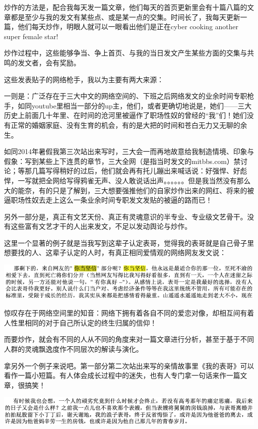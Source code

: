 \documentclass[9pt, b5paper]{article}
\begin{document}
炒作的方法是，配合我每天发一篇文章，他们每天的首页更新里会有十篇八篇的文章都是至少与我的发文有某些点、或是某一点的交集。时间长了，我每天更新一篇，他们每天炒作，明眼人就可以一眼看出他们是正在cyber cooking another super female star!

炒作过程中，这些能够争当、争上首页、与我的当日发文产生某些方面的交集与共鸣的发文者，会有奖励。 

这些发表贴子的网络枪手，我以为主要有两大来源：

一则是：广泛存在于三大中文的网络空间的、下班之后网络发文的业余时间专职枪手，如同youtube里相当一部分的up主，他们，或者更确切地说是，她们——三大历史上前面几十年里、在时间的沧河里被逼作了职场性奴的曾经的“我”们！她们没有正常的婚姻家庭、没有生育的机会，有的是大把的时间和苍白无力又无聊的余生。

如同2014年暑假我第三次站出来写时，三大会一而再地故意给我制造情境、印象与假象：写到某些上下连贯的章节，三大全网（是指当时发文的mitbbs.com）禁讨论；等那几篇写得稍好的过后，他们就会再有托儿蹦出来喊话说：好强悍、好彪悍，一写就把全网给写得鸦雀无声、没人敢说话出声。。。。。。但是我当然没有那么大的能奈，有的只是了解到，三大想要强推他们的自家炒作出来的网红、将来的被逼职场性奴去走上这么一条业余时间专职发文发贴的被逼的路而已！

另外一部分是，真正有文艺天份、真正有灵魂意识的半专业、专业级文艺骨干。没有这些富有文艺才干的人出来发文，不足以发动舆论与炒作。 

这里一个显著的例子就是当我写到这辈子认定表哥，觉得我的表哥就是自己骨子里想要找的人、这辈子认定的人时，有真正相同爱情观的网络网友发文说：

\begin{center}
\includegraphics[width=.9\linewidth]{./pic/backups_plans_20210412_165616.png}
\end{center}

惊叹存在于网络空间里的知音：网络下拥有着各自不同的爱恋对像，却相互间有着人性里相同的对于自己所认定的终生归属的信仰！

而要炒作，就会有不同的人从不同的角度来对一篇文章进行分析，甚至于基于不同人群的灵魂飘逸度作不同层次的解读与演化。

拿另外一个例子来说吧。第一部分第二次站出来写的亲情故事里《我的表哥》可以看作一篇小短篇。有人体会成长过程中的迷失，也有人专门拿一句话来作一篇文章，很搞笑！

\begin{center}
\includegraphics[width=.9\linewidth]{./pic/backups_plans_20210412_170341.png}
\end{center}
\end{document}
